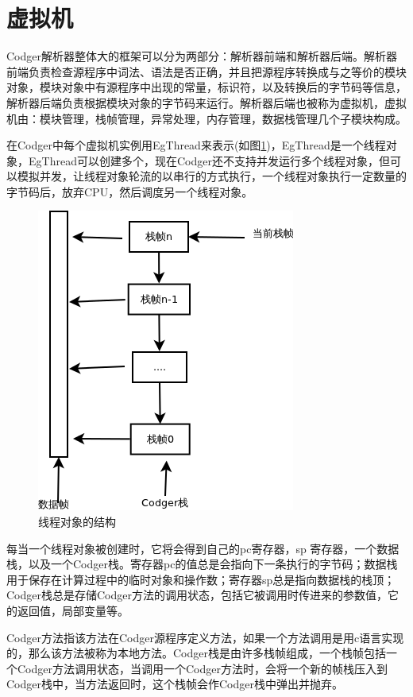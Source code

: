
\section{虚拟机}
Codger解析器整体大的框架可以分为两部分：解析器前端和解析器后端。解析器前端负责检查源程序中词法、语法是否正确，并且把源程序转换成与之等价的模块对象，模块对象中有源程序中出现的常量，标识符，以及转换后的字节码等信息，解析器后端负责根据模块对象的字节码来运行。解析器后端也被称为虚拟机，虚拟机由：模块管理，栈帧管理，异常处理，内存管理，数据栈管理几个子模块构成。

在Codger中每个虚拟机实例用EgThread来表示(如图\ref{fig:eg_thread})，EgThread是一个线程对象，EgThread可以创建多个，现在Codger还不支持并发运行多个线程对象，但可以模拟并发，让线程对象轮流的以串行的方式执行，一个线程对象执行一定数量的字节码后，放弃CPU，然后调度另一个线程对象。
\begin{figure}
\centering
\includegraphics[scale=0.5]{EgThread.png}
\caption{线程对象的结构}
\label{fig:eg_thread}
\end{figure}

每当一个线程对象被创建时，它将会得到自己的pc寄存器，sp 寄存器，一个数据栈，以及一个Codger栈。寄存器pc的值总是会指向下一条执行的字节码；数据栈用于保存在计算过程中的临时对象和操作数；寄存器sp总是指向数据栈的栈顶；Codger栈总是存储Codger方法的调用状态，包括它被调用时传进来的参数值，它的返回值，局部变量等。

Codger方法指该方法在Codger源程序定义方法，如果一个方法调用是用c语言实现的，那么该方法被称为本地方法。Codger栈是由许多栈帧组成，一个栈帧包括一个Codger方法调用状态，当调用一个Codger方法时，会将一个新的帧栈压入到Codger栈中，当方法返回时，这个栈帧会作Codger栈中弹出并抛弃。
